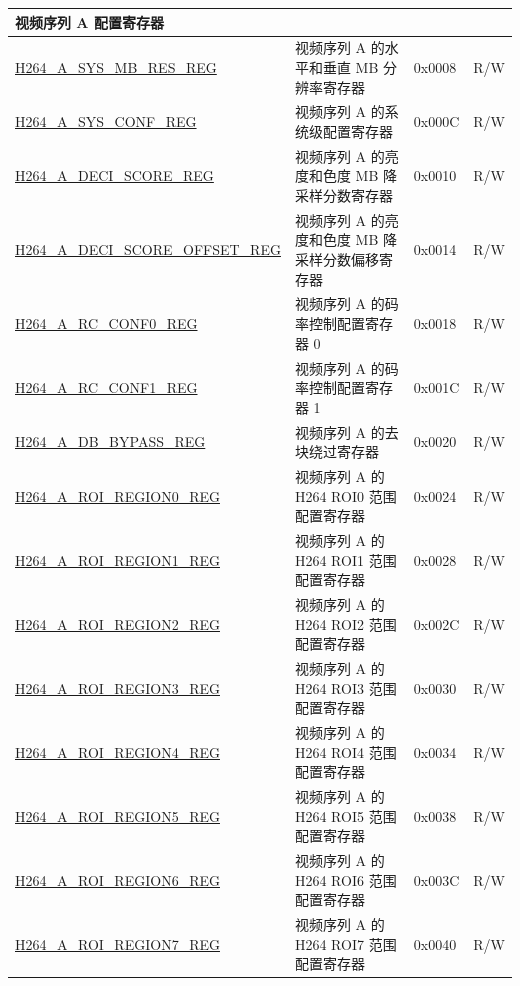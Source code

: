 \begin{longtable}{ | p{7cm} | p{6.2cm} | p{1.2cm} | p{1cm} | }
\multicolumn{4}{|l|}{\textbf{视频序列 A 配置寄存器}} \\ \hline
\hyperref[regdesc:H264ASYSMBRESREG]{H264\_A\_SYS\_MB\_RES\_REG} & 视频序列 A 的水平和垂直 MB 分辨率寄存器  & 0x0008 & R/W \\ \hline
\hyperref[regdesc:H264ASYSCONFREG]{H264\_A\_SYS\_CONF\_REG} & 视频序列 A 的系统级配置寄存器 & 0x000C & R/W \\ \hline
\hyperref[regdesc:H264ADECISCOREREG]{H264\_A\_DECI\_SCORE\_REG} & 视频序列 A 的亮度和色度 MB 降采样分数寄存器 & 0x0010 & R/W \\ \hline
\hyperref[regdesc:H264ADECISCOREOFFSETREG]{H264\_A\_DECI\_SCORE\_OFFSET\_REG} & 视频序列 A 的亮度和色度 MB 降采样分数偏移寄存器 & 0x0014 & R/W \\ \hline
\hyperref[regdesc:H264ARCCONF0REG]{H264\_A\_RC\_CONF0\_REG} & 视频序列 A 的码率控制配置寄存器 0 & 0x0018 & R/W \\ \hline
\hyperref[regdesc:H264ARCCONF1REG]{H264\_A\_RC\_CONF1\_REG} & 视频序列 A 的码率控制配置寄存器 1 & 0x001C & R/W \\ \hline
\hyperref[regdesc:H264ADBBYPASSREG]{H264\_A\_DB\_BYPASS\_REG} & 视频序列 A 的去块绕过寄存器 & 0x0020 & R/W \\ \hline
\hyperref[regdesc:H264AROIREGION0REG]{H264\_A\_ROI\_REGION0\_REG} & 视频序列 A 的 H264 ROI0 范围配置寄存器  & 0x0024 & R/W \\ \hline
\hyperref[regdesc:H264AROIREGION1REG]{H264\_A\_ROI\_REGION1\_REG} & 视频序列 A 的 H264 ROI1 范围配置寄存器 & 0x0028 & R/W \\ \hline
\hyperref[regdesc:H264AROIREGION2REG]{H264\_A\_ROI\_REGION2\_REG} & 视频序列 A 的 H264 ROI2 范围配置寄存器 & 0x002C & R/W \\ \hline
\hyperref[regdesc:H264AROIREGION3REG]{H264\_A\_ROI\_REGION3\_REG} & 视频序列 A 的 H264 ROI3 范围配置寄存器 & 0x0030 & R/W \\ \hline
\hyperref[regdesc:H264AROIREGION4REG]{H264\_A\_ROI\_REGION4\_REG} & 视频序列 A 的 H264 ROI4 范围配置寄存器 & 0x0034 & R/W \\ \hline
\hyperref[regdesc:H264AROIREGION5REG]{H264\_A\_ROI\_REGION5\_REG} & 视频序列 A 的 H264 ROI5 范围配置寄存器 & 0x0038 & R/W \\ \hline
\hyperref[regdesc:H264AROIREGION6REG]{H264\_A\_ROI\_REGION6\_REG} & 视频序列 A 的 H264 ROI6 范围配置寄存器 & 0x003C & R/W \\ \hline
\hyperref[regdesc:H264AROIREGION7REG]{H264\_A\_ROI\_REGION7\_REG} & 视频序列 A 的 H264 ROI7 范围配置寄存器 & 0x0040 & R/W \\ \hline

\end{longtable}
